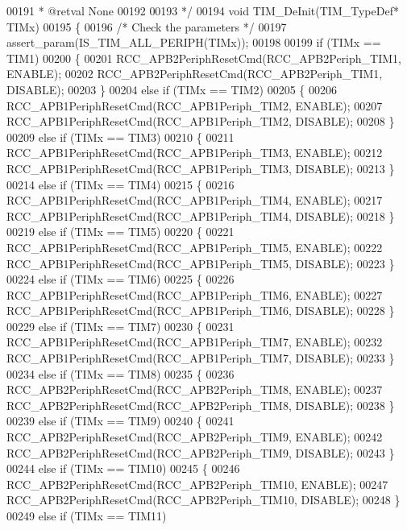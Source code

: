 \begin{DoxyCode}
00191 \textcolor{comment}{  * @retval None}
00192 \textcolor{comment}{}
00193 \textcolor{comment}{  */}
00194 \textcolor{keywordtype}{void} TIM_DeInit(TIM\_TypeDef* TIMx)
00195 \{
00196   \textcolor{comment}{/* Check the parameters */}
00197   assert_param(IS\_TIM\_ALL\_PERIPH(TIMx));
00198 
00199   \textcolor{keywordflow}{if} (TIMx == TIM1)
00200   \{
00201     RCC_APB2PeriphResetCmd(RCC_APB2Periph_TIM1, ENABLE);
00202     RCC_APB2PeriphResetCmd(RCC_APB2Periph_TIM1, DISABLE);
00203   \}
00204   \textcolor{keywordflow}{else} \textcolor{keywordflow}{if} (TIMx == TIM2)
00205   \{
00206     RCC_APB1PeriphResetCmd(RCC_APB1Periph_TIM2, ENABLE);
00207     RCC_APB1PeriphResetCmd(RCC_APB1Periph_TIM2, DISABLE);
00208   \}
00209   \textcolor{keywordflow}{else} \textcolor{keywordflow}{if} (TIMx == TIM3)
00210   \{
00211     RCC_APB1PeriphResetCmd(RCC_APB1Periph_TIM3, ENABLE);
00212     RCC_APB1PeriphResetCmd(RCC_APB1Periph_TIM3, DISABLE);
00213   \}
00214   \textcolor{keywordflow}{else} \textcolor{keywordflow}{if} (TIMx == TIM4)
00215   \{
00216     RCC_APB1PeriphResetCmd(RCC_APB1Periph_TIM4, ENABLE);
00217     RCC_APB1PeriphResetCmd(RCC_APB1Periph_TIM4, DISABLE);
00218   \}
00219   \textcolor{keywordflow}{else} \textcolor{keywordflow}{if} (TIMx == TIM5)
00220   \{
00221     RCC_APB1PeriphResetCmd(RCC_APB1Periph_TIM5, ENABLE);
00222     RCC_APB1PeriphResetCmd(RCC_APB1Periph_TIM5, DISABLE);
00223   \}
00224   \textcolor{keywordflow}{else} \textcolor{keywordflow}{if} (TIMx == TIM6)
00225   \{
00226     RCC_APB1PeriphResetCmd(RCC_APB1Periph_TIM6, ENABLE);
00227     RCC_APB1PeriphResetCmd(RCC_APB1Periph_TIM6, DISABLE);
00228   \}
00229   \textcolor{keywordflow}{else} \textcolor{keywordflow}{if} (TIMx == TIM7)
00230   \{
00231     RCC_APB1PeriphResetCmd(RCC_APB1Periph_TIM7, ENABLE);
00232     RCC_APB1PeriphResetCmd(RCC_APB1Periph_TIM7, DISABLE);
00233   \}
00234   \textcolor{keywordflow}{else} \textcolor{keywordflow}{if} (TIMx == TIM8)
00235   \{
00236     RCC_APB2PeriphResetCmd(RCC_APB2Periph_TIM8, ENABLE);
00237     RCC_APB2PeriphResetCmd(RCC_APB2Periph_TIM8, DISABLE);
00238   \}
00239   \textcolor{keywordflow}{else} \textcolor{keywordflow}{if} (TIMx == TIM9)
00240   \{
00241     RCC_APB2PeriphResetCmd(RCC_APB2Periph_TIM9, ENABLE);
00242     RCC_APB2PeriphResetCmd(RCC_APB2Periph_TIM9, DISABLE);
00243    \}
00244   \textcolor{keywordflow}{else} \textcolor{keywordflow}{if} (TIMx == TIM10)
00245   \{
00246     RCC_APB2PeriphResetCmd(RCC_APB2Periph_TIM10, ENABLE);
00247     RCC_APB2PeriphResetCmd(RCC_APB2Periph_TIM10, DISABLE);
00248   \}
00249   \textcolor{keywordflow}{else} \textcolor{keywordflow}{if} (TIMx == TIM11)

\end{DoxyCode}
